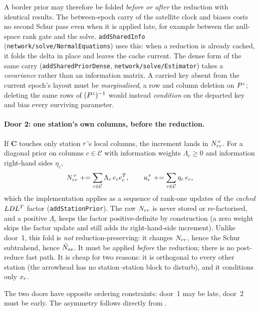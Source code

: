 \documentclass[main.tex]{subfiles}
\begin{document}
A border prior may therefore be folded \emph{before or after} the
reduction with identical results.  The between-epoch carry of the
satellite clock and biases costs no second Schur pass even when it is
applied late, for example between the null-space rank gate and the
solve.  \texttt{addSharedInfo} (\texttt{network/solve/NormalEquations})
uses this: when a reduction is already cached, it folds the delta in
place and leaves the cache current.  The dense form of the same carry
(\texttt{addSharedPriorDense}, \texttt{network/solve/Estimator}) takes a
\emph{covariance} rather than an information matrix.  A carried key
absent from the current epoch's layout must be \emph{marginalised}, a
row and column deletion on $P^{z}$; deleting the same rows of $(P^{z})^{-1}$
would instead \emph{condition} on the departed key and bias every
surviving parameter.

\paragraph{Door 2: one station's own columns, before the reduction.}
If $\bm{C}$ touches only station $r$'s local columns, the increment
lands in $N_{rr}^{\,r}$.  For a diagonal prior on columns
$c \in \mathcal{C}$ with information weights $\Lambda_c \ge 0$ and
information right-hand sides $\eta_c$,
\begin{equation}
N_{rr}^{\,r} \mathrel{+}= \sum_{c\in\mathcal{C}} \Lambda_c\,
   e_ce_c^{T},
\qquad
u_r^{\,r} \mathrel{+}= \sum_{c\in\mathcal{C}} \eta_c\,e_c ,
\label{eq:carry-localprior}
\end{equation}
which the implementation applies as a sequence of rank-one updates of
the \emph{cached} $LDL^{T}$ factor
(\texttt{addStationPrior}).  The raw $N_{rr}$ is never stored or
re-factorised, and a positive $\Lambda_c$ keeps the factor
positive-definite by construction (a zero weight skips the factor
update and still adds its right-hand-side increment).  Unlike door~1,
this fold is \emph{not} reduction-preserving: it changes $N_{rr}$, hence
the Schur subtrahend, hence $\tilde{N}_{ss}$.  It must be applied
\emph{before} the reduction; there is no post-reduce fast path.  It is
cheap for two reasons: it is orthogonal to every other station (the
arrowhead has no station--station block to disturb), and it conditions
only $x_{r}$.

The two doors have opposite ordering constraints: door~1 may be late,
door~2 must be early.  The asymmetry follows directly from
.
\end{document}
